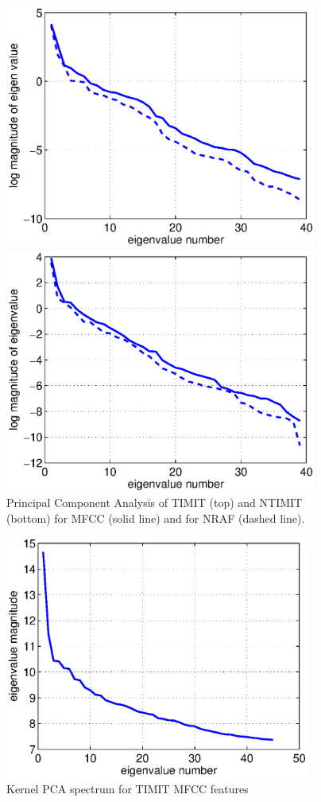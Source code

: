 \documentclass[12pt,letterpaper,doublespaced,ETD,dvips,proposal]{gtthesis}
\begin{document}
\begin{Body}
\begin{figure}[!htb]
\label{pca}
\centerline{\includegraphics[height=8cm]{timit_pca.eps}}
\centerline{\includegraphics[height=8cm]{ntimit_pca.eps}}
\caption{Principal Component Analysis of TIMIT (top) and NTIMIT (bottom) for MFCC (solid line)
and for NRAF (dashed line).}
\end{figure}


\begin{figure}[!htb]
\label{kernel_pca}
\centerline{\includegraphics[height=8cm]{kernel_pca.eps}}
\caption{Kernel PCA spectrum for TIMIT MFCC features}
\end{figure}


\end{Body}
\end{document}
